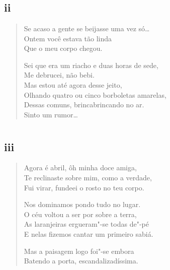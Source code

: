 \chapter*{}
\section*{ii}

\begin{verse}
Se acaso a gente se beijasse uma vez só\ldots{}\\
Ontem você estava tão linda\\
Que o meu corpo chegou.

Sei que era um riacho e duas horas de sede,\\
Me debrucei, não bebi.\\
Mas estou até agora desse jeito,\\
Olhando quatro ou cinco borboletas amarelas,\\
Dessas comuns, brincabrincando no ar.\\
Sinto um rumor\ldots{}
\end{verse}

\chapter*{}
\section*{iii}

\begin{verse}
Agora é abril, ôh minha doce amiga,\\
Te reclinaste sobre mim, como a verdade,\\
Fui virar, fundeei o rosto no teu corpo.

Nos dominamos pondo tudo no lugar.\\
O céu voltou a ser por sobre a terra,\\
As laranjeiras ergueram"-se todas de"-pé\\
E nelas fizemos cantar um primeiro sabiá.

Mas a paisagem logo foi"-se embora\\
Batendo a porta, escandalizadíssima.
\end{verse}

